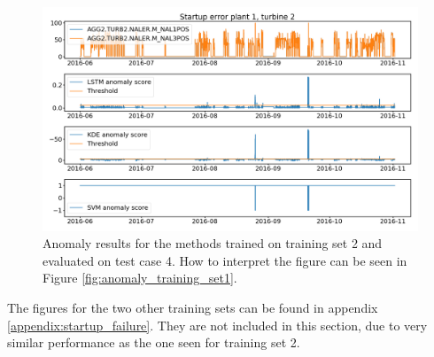         \begin{figure}
            \centering
            \includegraphics[width=\textwidth]{report/figures/analysis/startup_errors/t2_n1_n3_startup_error_anomaly_score_2_long.png}
            \caption{Anomaly results for the methods trained on training set 2 and evaluated on test case 4. How to interpret the figure can be seen in Figure \ref{fig:anomaly_training_set1}.}
            \label{fig:start_up_t2}
        \end{figure}
        The figures for the two other training sets can be found in appendix \ref{appendix:startup_failure}. They are not included in this section, due to very similar performance as the one seen for training set 2. 
    
    
    
    
    
    
    
    
    
    
    
    
    
    
    
    
    
    
    
    
        
    
